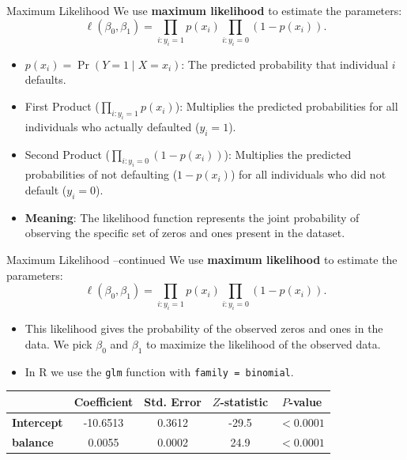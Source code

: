 \documentclass[aspectratio=169, 11pt]{beamer}
\begin{document}
\begin{frame}{Maximum Likelihood}
  We use \textbf{maximum likelihood} to estimate the parameters:
  \[
    \ell(\beta_0, \beta_1) = \prod_{i: y_i = 1} p(x_i) \prod_{i: y_i = 0} (1 - p(x_i)).
  \]
  \begin{itemize}
    \item $p(x_i) = \Pr(Y=1 \mid X=x_i)$: The predicted probability that individual $i$ defaults.
    \item First Product ($\prod_{i: y_i = 1} p(x_i)$): Multiplies the predicted probabilities for all individuals who actually defaulted ($y_i = 1$).
    \item Second Product ($\prod_{i: y_i = 0} (1 - p(x_i))$): Multiplies the predicted probabilities of not defaulting ($1 - p(x_i)$) for all individuals who did not default ($y_i = 0$).
    \item \textbf{Meaning}: The likelihood function represents the joint probability of observing the specific set of zeros and ones present in the dataset.
  \end{itemize}
\end{frame}

\begin{frame}{Maximum Likelihood --continued}
  We use \textbf{maximum likelihood} to estimate the parameters:
  \[
    \ell(\beta_0, \beta_1) = \prod_{i: y_i = 1} p(x_i) \prod_{i: y_i = 0} (1 - p(x_i)).
  \]
  \begin{itemize}
    \item This likelihood gives the probability of the observed zeros and ones in the data. We pick $\beta_0$ and $\beta_1$ to maximize the likelihood of the observed data.
    \item In R we use the \texttt{glm} function with \texttt{family = binomial}.
  \end{itemize}
  \vspace{0.2cm}
  \begin{table}
    \centering
    \small
    \begin{tabular}{l c c c c}
      \toprule
      & \textbf{Coefficient} & \textbf{Std. Error} & \textbf{$Z$-statistic} & \textbf{$P$-value} \\
      \midrule
      \textbf{Intercept} & -10.6513 & 0.3612 & -29.5 & $< 0.0001$ \\
      \textbf{balance}   &   0.0055 & 0.0002 &  24.9 & $< 0.0001$ \\
      \bottomrule
    \end{tabular}
  \end{table}
\end{frame}
\end{document}
